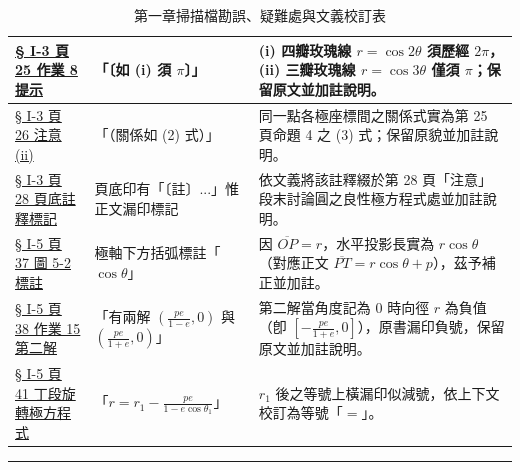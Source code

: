 \documentclass[a4paper,12pt,twoside]{article}
\begin{document}
\begin{table}[H]
\begin{tabularx}{\textwidth}{|p{3.2cm}|p{3.8cm}|X|}
\hyperref[note:b5s-ch1-p25-hw8]{§ I-3 頁 25 作業 8 提示} & 
「〔如 (i) 須 $\pi$〕」 & 
(i) 四瓣玫瑰線 $r=\cos 2\theta$ 須歷經 $2\pi$，(ii) 三瓣玫瑰線 $r=\cos 3\theta$ 僅須 $\pi$；保留原文並加註說明。 \\ \hline

\hyperref[note:b5s-ch1-p26-note]{§ I-3 頁 26 注意 (ii)} & 
「（關係如 (2) 式）」 & 
同一點各極座標間之關係式實為第 25 頁命題 4 之 (3) 式；保留原貌並加註說明。 \\ \hline

\hyperref[note:b5s-ch1-p28-fn]{§ I-3 頁 28 頁底註釋標記} & 
頁底印有「〔註〕...」惟正文漏印標記 & 
依文義將該註釋綴於第 28 頁「注意」段末討論圓之良性極方程式處並加註說明。 \\ \hline





\hyperref[note:b5s-ch1-p47-fig52]{§ I-5 頁 37 圖 5-2 標註} & 
極軸下方括弧標註「$\cos\theta$」 & 
因 $\overline{OP}=r$，水平投影長實為 $r\cos\theta$（對應正文 $\overline{PT}=r\cos\theta+p$），茲予補正並加註。 \\ \hline

\hyperref[note:b5s-ch1-p48-hw15]{§ I-5 頁 38 作業 15 第二解} & 
「有兩解 $(\frac{pe}{1-e}, 0)$ 與 $(\frac{pe}{1+e}, 0)$」 & 
第二解當角度記為 $0$ 時向徑 $r$ 為負值（卽 $[-\frac{pe}{1+e}, 0]$），原書漏印負號，保留原文並加註說明。 \\ \hline

\hyperref[note:b5s-ch1-p51-eq]{§ I-5 頁 41 丁段旋轉極方程式} & 
「$r = r_1 - \frac{pe}{1 - e\cos\theta_1}$」 & 
$r_1$ 後之等號上橫漏印似減號，依上下文校訂為等號「$=$」。 \\ \hline

\end{tabularx}
\caption{第一章掃描檔勘誤、疑難處與文義校訂表}
\label{tab:errata_b5_ch1}
\end{table}

\vspace{1em}
\hrule
\vspace{1em}

\tableofcontents
\newpage


\end{document}
